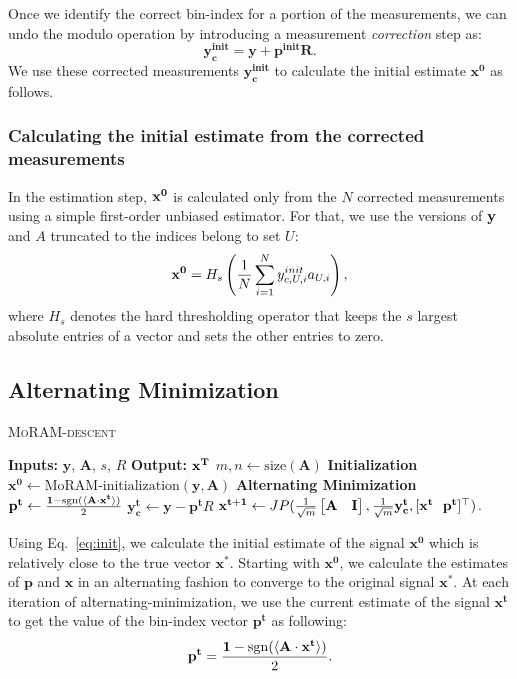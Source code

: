 Once we identify the correct bin-index for a portion of the measurements, we can undo the modulo operation by introducing a measurement \emph{correction} step as:
$$
\mathbf{y^{init}_{c} = y + p^{init}R}.
$$
We use these corrected measurements $\mathbf{y^{init}_c}$ to calculate the initial estimate $\mathbf{{x}^0}$ as follows.

\subsubsection{Calculating the initial estimate from the corrected measurements}
In the estimation step, $\mathbf{x^0}$ is calculated only from the $N$ corrected measurements using a simple first-order unbiased estimator. For that, we use the versions of $\mathbf{y}$ and $A$ truncated to the indices belong to set $U$:
\begin{equation}
\mb{x^0} = H_s\left( \frac{1}{N}\sum_{i=1}^{N}y^{init}_{c,U,i}a_{U,i}\right),
\label{eq:init}
\end{equation}
where $H_s$ denotes the hard thresholding operator that keeps the $s$ largest absolute entries of a vector and sets the other entries to zero.


\subsection{Alternating Minimization}
\label{sec:altmin}
\begin{algorithm}[t]
	\caption{\textsc{MoRAM-descent}}
	\label{alg:MoRAM}
	\begin{algorithmic}
		\State\textbf{Inputs:} $\mathbf{y}$, $\mathbf{A}$, $s$, $R$
		\State\textbf{Output:}  $\mathbf{x^T}$
		\State $m,n \leftarrow \mathrm{size}(\mathbf{A})$ 
		\State \textbf{Initialization}
		\State $\mathbf{x^0} \leftarrow \textrm{MoRAM-initialization}(\mathbf{y, A})$ 
		\State \textbf{Alternating Minimization}
		\State $\mathbf{{p}^{t}} \leftarrow \frac{\mathbf{1}-\mathrm{sgn}(\langle \mathbf{A} \cdot \mathbf{x^t} \rangle)}{2}$
		\State $\mathbf{y^t_c} \leftarrow \mathbf{y} - \mathbf{p^t}R$
		\State $\mathbf{{x}^{t+1}}\leftarrow \small{JP(\frac{1}{\sqrt{m}}\begin{bmatrix} \mathbf{A} & \mathbf{I} \end{bmatrix},\frac{1}{\sqrt{m}}\mathbf{y^t_c},[\mathbf{x^t~~p^t}]^\t)}$.
		\EndFor
	\end{algorithmic}
\end{algorithm}

Using Eq.~\ref{eq:init}, we calculate the initial estimate of the signal $\mathbf{{x}^0}$ which is relatively close to the true vector $\mathbf{x^*}$. Starting with $\mathbf{{x}^0}$, we calculate the estimates of $\mathbf{p}$ and $\mathbf{x}$ in an alternating fashion to converge to the original signal $\mathbf{x^*}$. At each iteration of alternating-minimization, we use the current estimate of the signal ${\mathbf{x^t}}$ to get the value of the bin-index vector $\mathbf{{p}^t}$ as following:
\begin{equation}
\mathbf{{p}^{t}} = \frac{\mathbf{1}-\sgn(\langle \mathbf{A} \cdot \mathbf{x^t} \rangle)}{2}.
\label{step1}
\end{equation}

